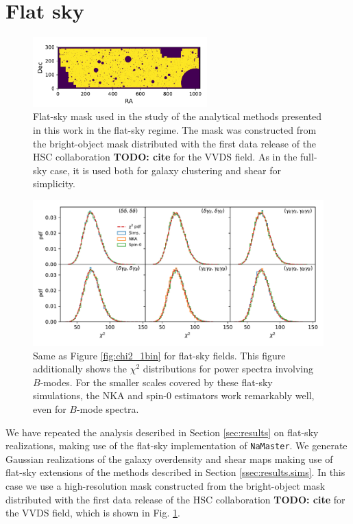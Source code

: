 \documentclass[a4paper,11pt]{article}
\newcommand{\todo}[1]{{\bf TODO: #1}}
\begin{document}
  \appendix
  \section{Flat sky}\label{app:flat}
    \begin{figure}
      \centering
      \includegraphics[width=0.6\textwidth]{./figures/mask-lss_flat1.pdf}
      \caption{Flat-sky mask used in the study of the analytical
        methods presented in this work in the flat-sky regime. The mask was
        constructed from the bright-object mask distributed with the first
        data release of the HSC collaboration \todo{cite} for the VVDS
        field. As in the full-sky case, it is used both for galaxy clustering
        and shear for simplicity.} \label{fig:mask_flat}
    \end{figure}

    \begin{figure}
      \centering
      \includegraphics[width=\textwidth]{./figures/run_chi2_TT_TE_EE_TB_EB_BB.pdf}
      \caption{Same as Figure \ref{fig:chi2_1bin} for flat-sky fields. This figure additionally shows the $\chi^2$ distributions for power spectra involving $B$-modes. For the smaller scales covered by these flat-sky simulations, the NKA and spin-0 estimators work remarkably well, even for $B$-mode spectra.}
      \label{fig:chi2_1bin_flat}
    \end{figure}
    We have repeated the analysis described in Section \ref{sec:results} on flat-sky realizations, making use of the flat-sky implementation of {\tt NaMaster}. We generate Gaussian realizations of the galaxy overdensity and shear maps making use of flat-sky extensions of the methods described in Section \ref{ssec:results.sims}. In this case we use a high-resolution mask constructed from the bright-object mask distributed with the first data release of the HSC collaboration \todo{cite} for the VVDS field, which is shown in Fig. \ref{fig:mask_flat}. 
    
\end{document}
